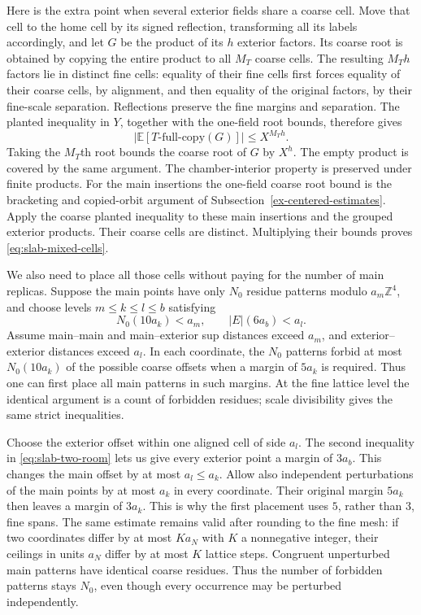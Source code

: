 Here is the extra point when several exterior fields share a coarse cell.
Move that cell to the home cell by its signed reflection, transforming all
its labels accordingly, and let $G$ be the product of its $h$ exterior
factors. Its coarse root is obtained by copying the entire product to all
$M_T$ coarse cells. The resulting $M_Th$ factors lie in distinct fine
cells: equality of their fine cells first forces equality of their coarse
cells, by alignment, and then equality of the original factors, by their
fine-scale separation. Reflections preserve the fine margins and
separation. The planted inequality in $Y$, together with the one-field
root bounds, therefore gives
\[
       |\mathbb E[T\text{-full-copy}(G)]|\leq X^{M_Th}.
\]
Taking the $M_T$th root bounds the coarse root of $G$ by $X^h$.
The empty product is covered by the same argument. The chamber-interior
property is preserved under finite products. For the main insertions the
one-field coarse root bound is the bracketing and copied-orbit argument
of Subsection~\ref{ex-centered-estimates}. Apply the coarse planted inequality
to these main insertions and the grouped exterior products. Their coarse
cells are distinct. Multiplying their bounds proves
\eqref{eq:slab-mixed-cells}.

We also need to place all those cells without paying for the number of
main replicas. Suppose the main points have only $N_0$ residue patterns
modulo $a_m\mathbb Z^4$, and choose levels
$m\leq k\leq l\leq b$ satisfying
\begin{equation}\label{eq:slab-two-room}
 N_0(10a_k)<a_m,\qquad |E|(6a_b)<a_l.
\end{equation}
Assume main--main and main--exterior sup distances exceed $a_m$, and
exterior--exterior distances exceed $a_l$. In each coordinate, the
$N_0$ patterns forbid at most $N_0(10a_k)$ of the possible coarse offsets
when a margin of $5a_k$ is required. Thus one can first place all main
patterns in such margins. At the fine lattice level the identical
argument is a count of forbidden residues; scale divisibility gives the
same strict inequalities.

Choose the exterior offset within one aligned cell of side $a_l$.
The second inequality in \eqref{eq:slab-two-room} lets us give every
exterior point a margin of $3a_b$. This changes the main offset by at
most $a_l\leq a_k$. Allow also independent perturbations of the main
points by at most $a_k$ in every coordinate. Their original margin
$5a_k$ then leaves a margin of $3a_k$. This is why the first placement
uses $5$, rather than $3$, fine spans. The same estimate remains valid
after rounding to the fine mesh: if two coordinates differ by at most
$K a_N$ with $K$ a nonnegative integer, their ceilings in units $a_N$ differ by at most $K$ lattice
steps. Congruent unperturbed main patterns have identical coarse
residues. Thus the number of forbidden patterns stays $N_0$, even
though every occurrence may be perturbed independently.

